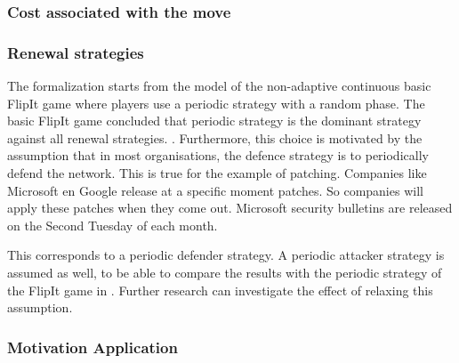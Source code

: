 \subsubsection{Cost associated with the move}
\subsubsection{Renewal strategies}
The formalization starts from the model of the non-adaptive continuous basic FlipIt game where players use a periodic strategy with a random phase. The basic FlipIt game concluded that periodic strategy is the dominant strategy against all renewal strategies. . Furthermore, this choice is motivated by the assumption that in most organisations, the defence strategy is to periodically defend the network.  This is true for the example of patching. Companies like Microsoft en Google release at a specific moment patches. So companies will apply these patches when they come out. Microsoft security bulletins are released on the Second Tuesday of each month. \cite{MicroPatch}

This corresponds to a periodic defender strategy.  A periodic attacker strategy is assumed as well, to be able to compare the results with the periodic strategy of the FlipIt game in \cite{FlipIt}. %
Further research can investigate the effect of relaxing this assumption. \\









\subsubsection{Motivation Application}
